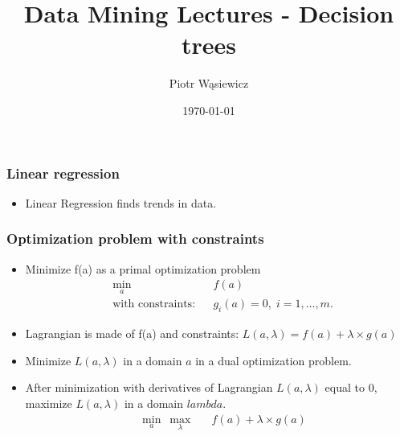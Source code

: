 \documentclass[proffesionalfonts]{beamer}
\title[EARIN]{Data Mining Lectures - Decision trees}
\author{Piotr Wąsiewicz}
\institute[ICS PW]
{
Institute of Computer Science\\
\medskip
{\emph{pwasiewi@elka.pw.edu.pl}}
}
\date{\today}
\begin{document}
\lstset{language=R}



\loadedtable

\begin{frame}
\frametitle{Linear regression}
\begin{block}{}
\begin{itemize}
\item[\ ] Linear Regression finds trends in data.
\end{itemize}
\end{block}
\end{frame}

\begin{frame}
\frametitle{Optimization problem with constraints}
\begin{block}{}
\begin{itemize}
\item Minimize f(a) as a primal optimization problem
\begin{equation*}
\begin{aligned}
& \underset{a}{\min}
& & f(a) \\
& \text{with constraints:}
& & g_i(a) = 0, \; i = 1, \ldots, m.
\end{aligned}
\end{equation*}
\item Lagrangian is made of f(a) and constraints: $L(a,\lambda)=f(a)+\lambda\times g(a)$
\item Minimize $L(a,\lambda)$ in a domain $a$ in a dual optimization problem.
\item After minimization with derivatives of Lagrangian $L(a,\lambda)$ equal to 0, maximize $L(a,\lambda)$ in a domain $lambda$.
\begin{equation*}
\begin{aligned}
& \underset{a}{\min}\ \underset{\lambda}{\max} &  & f(a)+\lambda\times g(a)
\end{aligned}
\end{equation*}
\end{itemize}
\end{block}
\end{frame}
\end{document}
